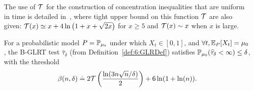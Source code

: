 The use of $\mathcal{T}$ for the construction of concentration inequalities that are uniform in time is detailed in~\cite{KK18Martingales}, where tight upper bound on this function $\mathcal{T}$ are also given:
$\mathcal{T} (x) \simeq x + 4 \ln\big(1 + x + \sqrt{2x}\big)$ for $x\geq 5$ and $\mathcal{T}(x) \sim x$ when $x$ is large.

\begin{lemma}\label{lem:6:FalseAlarm}
\begin{leftbar}[lemmabar]  %
    For a probabilistic model $P = \mathbb{P}_{\mu_0}$ under which $X_t \in [0,1]$,
    and $\forall t, \mathbb{E}_P[X_t] = \mu_0$,
    the B-GLRT test $\widehat{\tau}_\delta$ (from Definition~\ref{def:6:GLRDef}) satisfies
    $\mathbb{P}_{\mu_0}(\widehat{\tau}_\delta < \infty) \leq \delta$, with the threshold
    \begin{equation}\label{def:6:beta}
        \beta(n,\delta) \overset{.}{=} 2\mathcal{T}\left(\frac{\ln(3n\sqrt{n}/\delta)}{2}\right) + 6\ln(1+\ln(n)).
    \end{equation}
\end{leftbar}  %
\end{lemma}

